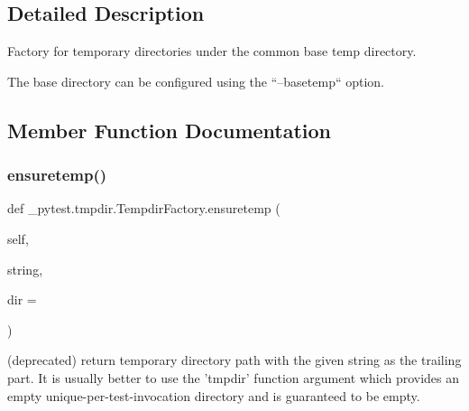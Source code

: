 \subsection{Detailed Description}
\begin{DoxyVerb}Factory for temporary directories under the common base temp directory.

The base directory can be configured using the ``--basetemp`` option.
\end{DoxyVerb}
 

\subsection{Member Function Documentation}
\mbox{\label{class__pytest_1_1tmpdir_1_1_tempdir_factory_aa7de55caeecdc6dafeba3bfa130df7b6}} 
\subsubsection{\texorpdfstring{ensuretemp()}{ensuretemp()}}
{\footnotesize\ttfamily def \+\_\+pytest.\+tmpdir.\+Tempdir\+Factory.\+ensuretemp (\begin{DoxyParamCaption}\item[{}]{self,  }\item[{}]{string,  }\item[{}]{dir = {} }\end{DoxyParamCaption})}

\begin{DoxyVerb}(deprecated) return temporary directory path with
    the given string as the trailing part.  It is usually
    better to use the 'tmpdir' function argument which
    provides an empty unique-per-test-invocation directory
    and is guaranteed to be empty.
\end{DoxyVerb}
 \mbox{\label{class__pytest_1_1tmpdir_1_1_tempdir_factory_adb19657479e448f3661212cf73f0d9ac}} 
